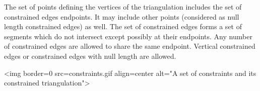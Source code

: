The set of points defining the vertices of the triangulation
includes the set of constrained edges endpoints. It may include other points
(considered as null length constrained edges) as well.  The set of
constrained edges forms a set of segments which do not intersect
except possibly at their endpoints.  Any number of constrained edges
are allowed to share the same endpoint.  Vertical constrained edges or
constrained edges with null length are allowed.

\begin{ccTexOnly}
\begin{center}   \end{center}
\end{ccTexOnly}

\begin{ccHtmlOnly}
<img border=0 src=constraints.gif align=center alt="A set of
constraints and its constrained triangulation">
\end{ccHtmlOnly}

